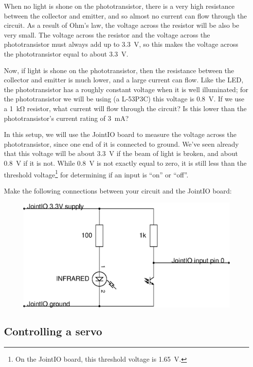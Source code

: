 \documentclass{article}
\begin{document}
When no light is shone on the phototransistor, there is a very high resistance
between the collector and emitter, and so almost no current can flow through
the circuit. As a result of Ohm's law, the voltage across the resistor will be
also be very small. The voltage across the resistor and the voltage across the
phototransistor must always add up to \SI{3.3}{\volt}, so this makes the
voltage across the phototransistor equal to about \SI{3.3}{\volt}.

Now, if light is shone on the phototransistor, then the resistance between the
collector and emitter is much lower, and a large current can flow. Like the LED,
the phototransistor has a roughly constant voltage when it is well illuminated;
for the phototransistor we will be using (a L-53P3C) this voltage is
\SI{0.8}{\volt}. If we use a \SI{1}{\kilo\ohm} resistor, what current will flow
through the circuit? Is this lower than the phototransistor's current rating of
\SI{3}{\milli\ampere}?

In this setup, we will use the JointIO board to measure the voltage across the
phototransistor, since one end of it is connected to ground. We've seen already
that this voltage will be about \SI{3.3}{\volt} if the beam of light is broken,
and about \SI{0.8}{\volt} if it is not. While \SI{0.8}{\volt} is not exactly
equal to zero, it is still less than the threshold voltage\footnote{On the
JointIO board, this threshold voltage is \SI{1.65}{\volt}.} for determining
if an input is ``on'' or ``off''.

Make the following connections between your circuit and the JointIO board:

\begin{figure}[h]
\centering
\includegraphics[scale=.7]{assets/fig/schem/ir-jointio}
\label{fig:schem:ir-jointio}
\end{figure}

\subsection{Controlling a servo}
\end{document}
